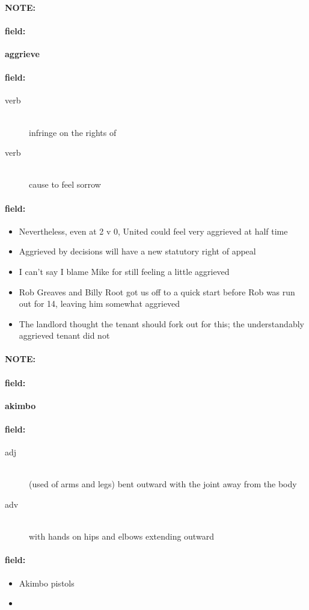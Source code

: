 \documentclass[12pt]{article}
\newenvironment{note}{\paragraph{NOTE:}}{}
\newenvironment{field}{\paragraph{field:}}{}
\begin{document}
\begin{note}
\begin{field}
\textbf{\large aggrieve}
\end{field}


\begin{field}
\begin{description}
\item[verb] \hfill \\ 
infringe on the rights of

\item[verb] \hfill \\ 
cause to feel sorrow

\end{description}
\end{field}

\begin{field}
\begin{itemize}
\item Nevertheless, even at 2 v 0, United could feel very aggrieved at half time
\item Aggrieved by decisions will have a new statutory right of appeal
\item I can't say I blame Mike for still feeling a little aggrieved
\item Rob Greaves and Billy Root got us off to a quick start before Rob was run out for 14, leaving him somewhat aggrieved
\item The landlord thought the tenant should fork out for this; the understandably aggrieved tenant did not
\end{itemize}
\end{field}
\end{note}
\begin{note}
\begin{field}
\textbf{\large akimbo}
\end{field}


\begin{field}
\begin{description}
\item[adj] \hfill \\ 
(used of arms and legs) bent outward with the joint away from the body

\item[adv] \hfill \\ 
with hands on hips and elbows extending outward

\end{description}
\end{field}

\begin{field}
\begin{itemize}
\item Akimbo pistols
\item 
\end{itemize}
\end{field}
\end{note}
\end{document}
